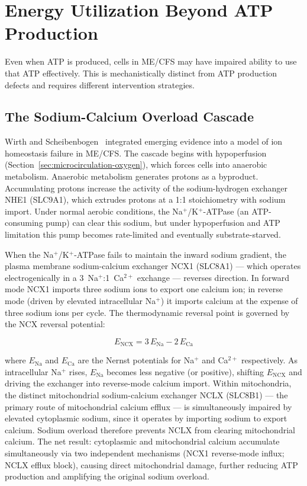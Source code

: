 \section{Energy Utilization Beyond ATP Production}
\label{sec:energy-utilization}

Even when ATP is produced, cells in ME/CFS may have impaired ability to use that ATP effectively. This is mechanistically distinct from ATP production defects and requires different intervention strategies.

\subsection{The Sodium-Calcium Overload Cascade}
\label{sec:sodium-calcium-cascade}

Wirth and Scheibenbogen~\cite{WirthScheibenbogen2020} integrated emerging evidence into a model of ion homeostasis failure in ME/CFS. The cascade begins with hypoperfusion (Section~\ref{sec:microcirculation-oxygen}), which forces cells into anaerobic metabolism. Anaerobic metabolism generates protons as a byproduct. Accumulating protons increase the activity of the sodium-hydrogen exchanger NHE1 (SLC9A1), which extrudes protons at a 1:1 stoichiometry with sodium import. Under normal aerobic conditions, the Na$^+$/K$^+$-ATPase (an ATP-consuming pump) can clear this sodium, but under hypoperfusion and ATP limitation this pump becomes rate-limited and eventually substrate-starved.

When the Na$^+$/K$^+$-ATPase fails to maintain the inward sodium gradient, the plasma membrane sodium-calcium exchanger NCX1 (SLC8A1) --- which operates electrogenically in a 3~Na$^+$:1~Ca$^{2+}$ exchange --- reverses direction. In forward mode NCX1 imports three sodium ions to export one calcium ion; in reverse mode (driven by elevated intracellular Na$^+$) it imports calcium at the expense of three sodium ions per cycle. The thermodynamic reversal point is governed by the NCX reversal potential:

\begin{equation}
E_\text{NCX} = 3\,E_\text{Na} - 2\,E_\text{Ca}
\label{eq:ncx-reversal}
\end{equation}

where $E_\text{Na}$ and $E_\text{Ca}$ are the Nernst potentials for Na$^+$ and Ca$^{2+}$ respectively. As intracellular Na$^+$ rises, $E_\text{Na}$ becomes less negative (or positive), shifting $E_\text{NCX}$ and driving the exchanger into reverse-mode calcium import. Within mitochondria, the distinct mitochondrial sodium-calcium exchanger NCLX (SLC8B1) --- the primary route of mitochondrial calcium efflux --- is simultaneously impaired by elevated cytoplasmic sodium, since it operates by importing sodium to export calcium. Sodium overload therefore prevents NCLX from clearing mitochondrial calcium. The net result: cytoplasmic and mitochondrial calcium accumulate simultaneously via two independent mechanisms (NCX1 reverse-mode influx; NCLX efflux block), causing direct mitochondrial damage, further reducing ATP production and amplifying the original sodium overload.


